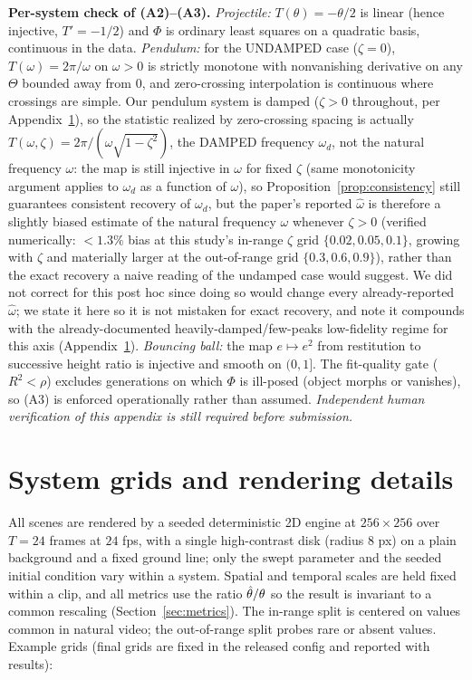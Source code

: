 \textbf{Per-system check of (A2)--(A3).} \emph{Projectile:} $T(\theta)=-\theta/2$
is linear (hence injective, $T'=-1/2$) and $\Phi$ is ordinary least squares on a
quadratic basis, continuous in the data. \emph{Pendulum:} for the UNDAMPED
case ($\zeta=0$), $T(\omega)=2\pi/\omega$ on $\omega>0$ is strictly monotone
with nonvanishing derivative on any $\Theta$ bounded away from $0$, and
zero-crossing interpolation is continuous where crossings are simple. Our
pendulum system is damped ($\zeta>0$ throughout, per
Appendix~\ref{app:systems}), so the statistic realized by zero-crossing
spacing is actually $T(\omega,\zeta)=2\pi/(\omega\sqrt{1-\zeta^2})$, the
DAMPED frequency $\omega_d$, not the natural frequency $\omega$: the map is
still injective in $\omega$ for fixed $\zeta$ (same monotonicity argument
applies to $\omega_d$ as a function of $\omega$), so Proposition~\ref{prop:consistency}
still guarantees consistent recovery of $\omega_d$, but the paper's reported
$\hat\omega$ is therefore a slightly biased estimate of the natural
frequency $\omega$ whenever $\zeta>0$ (verified numerically: $<1.3\%$ bias at
this study's in-range $\zeta$ grid $\{0.02,0.05,0.1\}$, growing with $\zeta$
and materially larger at the out-of-range grid $\{0.3,0.6,0.9\}$), rather
than the exact recovery a naive reading of the undamped case would suggest.
We did not correct for this post hoc since doing so would change every
already-reported $\hat\omega$; we state it here so it is not mistaken for
exact recovery, and note it compounds with the already-documented
heavily-damped/few-peaks low-fidelity regime for this axis
(Appendix~\ref{app:systems}). \emph{Bouncing ball:} the map
$e\mapsto e^2$ from restitution to successive height ratio is injective and
smooth on $(0,1]$. The fit-quality gate ($R^2<\rho$) excludes generations on
which $\Phi$ is ill-posed (object morphs or vanishes), so (A3) is enforced
operationally rather than assumed. \emph{Independent human verification of this
appendix is still required before submission.}

\section{System grids and rendering details}
\label{app:systems}
All scenes are rendered by a seeded deterministic 2D engine at
$256\times256$ over $T{=}24$ frames at $24$ fps, with a single high-contrast
disk (radius $8$ px) on a plain background and a fixed ground line; only the
swept parameter and the seeded initial condition vary within a system. Spatial
and temporal scales are held fixed within a clip, and all metrics use the ratio
$\hat{\theta}/\theta$ so the result is invariant to a common rescaling
(Section~\ref{sec:metrics}). The in-range split is centered on values common in
natural video; the out-of-range split probes rare or absent values. Example
grids (final grids are fixed in the released config and reported with results):

